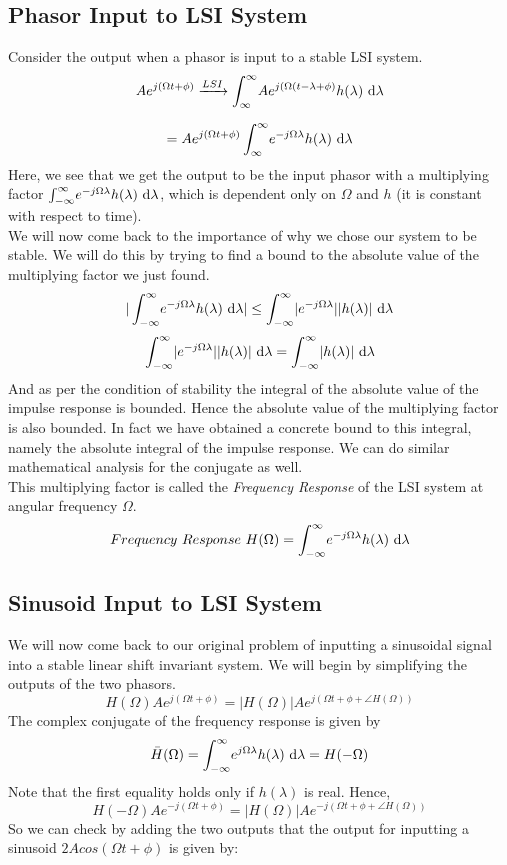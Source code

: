 \subsection{Phasor Input to LSI System}
Consider the output when a phasor is input to a stable LSI system.
\[
Ae^{j(\Omega t + \phi)} \xrightarrow{LSI} 
 \int_{\infty}^{\infty} \! Ae^{j(\Omega (t - \lambda + \phi)}h(\lambda) \ \dm \lambda
\]
 
\[ =
Ae^{j(\Omega t + \phi)} \int_{\infty}^{\infty} \! {e^{-j\Omega\lambda}h(\lambda) \ \mathrm{d} \lambda}
\]
Here, we see that we get the output to be the input phasor with a multiplying factor $\int_{-\infty}^{\infty} \! {e^{-j\Omega\lambda}h(\lambda) \ \mathrm{d} \lambda}$, which is dependent only on $\Omega$ and $h$ (it is constant with respect to time).\\
We will now come back to the importance of why we chose our system to be stable. We will do this by trying to find a bound to the absolute value of the multiplying factor we just found.
\[
| \int_{-\infty}^{\infty} \! {e^{-j\Omega\lambda}h(\lambda) \ \mathrm{d} \lambda} | \leq 
\int_{-\infty}^{\infty} \! { |e^{-j\Omega\lambda}||h(\lambda)| \ \mathrm{d} \lambda }
\]
\[
\int_{-\infty}^{\infty} \! { |e^{-j\Omega\lambda}||h(\lambda)| \ \mathrm{d} \lambda } =
\int_{-\infty}^{\infty} \! {|h(\lambda)| \ \mathrm{d} \lambda }
\]
And as per the condition of stability the integral of the absolute value of the impulse response is bounded. Hence the absolute value of the multiplying factor is also bounded. In fact we have obtained a concrete bound to this integral, namely the absolute integral of the impulse response. We can do similar mathematical analysis for the conjugate as well.\\
This multiplying factor is called the \textit{Frequency Response} of the LSI system at angular frequency $\Omega$.
\[
	Frequency\ Response\ H(\Omega) = \int_{-\infty}^{\infty} \! {e^{-j\Omega\lambda}h(\lambda) \ \mathrm{d} \lambda}
\] 
\subsection{Sinusoid Input to LSI System}
We will now come back to our original problem of inputting a sinusoidal signal into a stable linear shift invariant system. We will begin by simplifying the outputs of the two phasors.
\[
	H(\Omega)Ae^{j(\Omega t + \phi)} = |H(\Omega)|Ae^{j(\Omega t + \phi +  \angle  H(\Omega))}
\]
The complex conjugate of the frequency response is given by
\[
\bar{H}(\Omega) = \int_{-\infty}^{\infty} \! {e^{j\Omega\lambda}h(\lambda) \ \mathrm{d} \lambda} = H(-\Omega)
\]
Note that the first equality holds only if $h(\lambda)$ is real.
Hence,
\[
H(-\Omega)Ae^{-j(\Omega t + \phi)} = |H(\Omega)|Ae^{-j(\Omega t + \phi +  \angle  H(\Omega))}
\]
So we can check by adding the two outputs that the output for inputting a sinusoid $2Acos(\Omega t + \phi)$ is given by:

